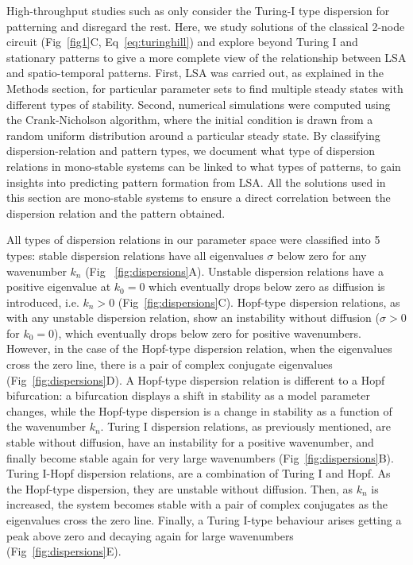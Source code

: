 High-throughput studies such as \cite{Scholes2019, Zheng2016, Marcon} only consider the Turing-I type dispersion for patterning and disregard the rest.
Here, we study solutions of the classical 2-node circuit (Fig~\ref{fig1}C, Eq~\ref{eq:turinghill}) and explore beyond Turing I and stationary patterns to give a more complete view of the relationship between LSA and spatio-temporal patterns. 
First, LSA was carried out, as explained in the Methods section, for particular parameter sets to find multiple steady states with different types of stability. 
Second, numerical simulations were computed using the Crank-Nicholson algorithm, where the initial condition is drawn from a random uniform distribution around a particular steady state. By classifying dispersion-relation and pattern types, we document what type of dispersion relations in mono-stable systems can be linked to what types of patterns, to gain insights into predicting pattern formation from LSA. All the solutions used in this section are mono-stable systems to ensure a direct correlation between the dispersion relation and the pattern obtained.

All types of dispersion relations in our parameter space were classified into 5 types: stable dispersion relations have all eigenvalues $\sigma$ below zero for any wavenumber $k_{n}$ (Fig ~\ref{fig:dispersions}A). Unstable dispersion relations have a positive eigenvalue at $k_{0}=0$ which eventually drops below zero as diffusion is introduced, i.e. $k_{n}>0$ (Fig~\ref{fig:dispersions}C). Hopf-type dispersion relations, as with any unstable dispersion relation, show an instability without diffusion ($\sigma>0$ for $k_{0}=0$), which eventually drops below zero for positive wavenumbers. However, in the case of the Hopf-type dispersion relation, when the eigenvalues cross the zero line, there is a pair of complex conjugate eigenvalues (Fig~\ref{fig:dispersions}D).
A Hopf-type dispersion relation is different to a Hopf bifurcation: a bifurcation displays a shift in stability as a model parameter changes, while the Hopf-type dispersion is a change in stability as a function of the wavenumber $k_{n}$.
Turing I dispersion relations, as previously mentioned, are stable without diffusion, have an instability for a positive wavenumber, and finally become stable again for very large wavenumbers (Fig~\ref{fig:dispersions}B).
Turing I-Hopf dispersion relations, are a combination of Turing I and Hopf. As the Hopf-type dispersion, they are unstable without diffusion. Then, as $k_{n}$ is increased, the system becomes stable with a pair of complex conjugates as the eigenvalues cross the zero line.
Finally, a Turing I-type behaviour arises getting a peak above zero and decaying again for large wavenumbers (Fig~\ref{fig:dispersions}E).

